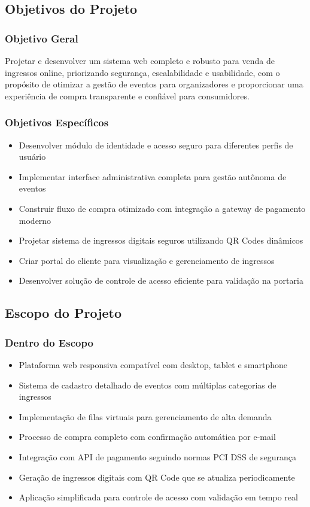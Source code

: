 \subsection{Objetivos do Projeto}

\subsubsection{Objetivo Geral}
Projetar e desenvolver um sistema web completo e robusto para venda de ingressos online, priorizando segurança, escalabilidade e usabilidade, com o propósito de otimizar a gestão de eventos para organizadores e proporcionar uma experiência de compra transparente e confiável para consumidores.

\subsubsection{Objetivos Específicos}
\begin{itemize}
    \item Desenvolver módulo de identidade e acesso seguro para diferentes perfis de usuário
    \item Implementar interface administrativa completa para gestão autônoma de eventos
    \item Construir fluxo de compra otimizado com integração a gateway de pagamento moderno
    \item Projetar sistema de ingressos digitais seguros utilizando QR Codes dinâmicos
    \item Criar portal do cliente para visualização e gerenciamento de ingressos
    \item Desenvolver solução de controle de acesso eficiente para validação na portaria
\end{itemize}

\subsection{Escopo do Projeto}

\subsubsection{Dentro do Escopo}
\begin{itemize}
    \item Plataforma web responsiva compatível com desktop, tablet e smartphone
    \item Sistema de cadastro detalhado de eventos com múltiplas categorias de ingressos
    \item Implementação de filas virtuais para gerenciamento de alta demanda
    \item Processo de compra completo com confirmação automática por e-mail
    \item Integração com API de pagamento seguindo normas PCI DSS de segurança
    \item Geração de ingressos digitais com QR Code que se atualiza periodicamente
    \item Aplicação simplificada para controle de acesso com validação em tempo real
\end{itemize}

